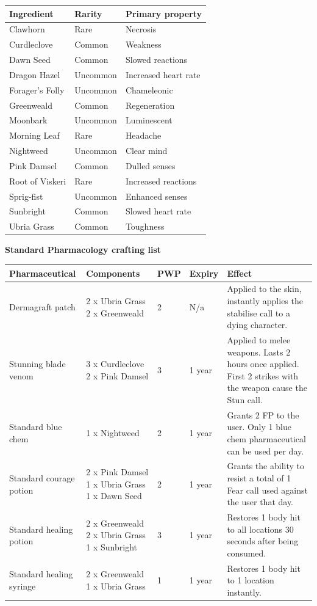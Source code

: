 \begin{table}
\begin{tabular}{|l|l|l|} \hline 
Ingredient & Rarity & Primary property \\
 \hline Clawhorn & Rare & Necrosis \\
 \hline Curdleclove & Common & Weakness \\
 \hline Dawn Seed & Common & Slowed reactions \\
 \hline Dragon Hazel & Uncommon & Increased heart rate \\
 \hline Forager's Folly & Uncommon & Chameleonic \\
 \hline Greenweald & Common & Regeneration \\
 \hline Moonbark & Uncommon & Luminescent \\
 \hline Morning Leaf & Rare & Headache \\
 \hline Nightweed & Uncommon & Clear mind \\
 \hline Pink Damsel & Common & Dulled senses \\
 \hline Root of Viskeri & Rare & Increased reactions \\
 \hline Sprig-fist & Uncommon & Enhanced senses \\
 \hline Sunbright & Common & Slowed heart rate \\
 \hline Ubria Grass & Common & Toughness \\
 \hline \end{tabular}

\end{table}

\textbf{Standard Pharmacology crafting list}

\begin{table}
\begin{tabular}{|l|l|l|l|l|} \hline 
Pharmaceutical & Components & PWP & Expiry & Effect \\
 \hline Dermagraft patch & 2 x Ubria Grass 2 x Greenweald & 2 & N/a & Applied to the skin, instantly applies the stabilise call to a dying character. \\
 \hline Stunning blade venom & 3 x Curdleclove 2 x Pink Damsel & 3 & 1 year & Applied to melee weapons. Lasts 2 hours once applied. First 2 strikes with the weapon cause the Stun call. \\
 \hline Standard blue chem & 1 x Nightweed & 2 & 1 year & Grants 2 FP to the user. Only 1 blue chem pharmaceutical can be used per day. \\
 \hline Standard courage potion & 2 x Pink Damsel 1 x Ubria Grass 1 x Dawn Seed & 2 & 1 year & Grants the ability to resist a total of 1 Fear call used against the user that day. \\
 \hline Standard healing potion & 2 x Greenweald 2 x Ubria Grass 1 x Sunbright & 3 & 1 year & Restores 1 body hit to all locations 30 seconds after being consumed. \\
 \hline Standard healing syringe & 2 x Greenweald 1 x Ubria Grass & 1 & 1 year & Restores 1 body hit to 1 location instantly. \\
 \hline \end{tabular}

\end{table}

